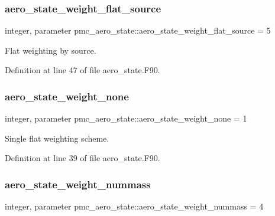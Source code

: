 \subsubsection{\texorpdfstring{aero\+\_\+state\+\_\+weight\+\_\+flat\+\_\+source}{aero\_state\_weight\_flat\_source}}
{\footnotesize\ttfamily integer, parameter pmc\+\_\+aero\+\_\+state\+::aero\+\_\+state\+\_\+weight\+\_\+flat\+\_\+source = 5}



Flat weighting by source. 



Definition at line 47 of file aero\+\_\+state.\+F90.

\mbox{\label{namespacepmc__aero__state_afae976ee50ab7c0415628dd99a6feded}} 
\subsubsection{\texorpdfstring{aero\+\_\+state\+\_\+weight\+\_\+none}{aero\_state\_weight\_none}}
{\footnotesize\ttfamily integer, parameter pmc\+\_\+aero\+\_\+state\+::aero\+\_\+state\+\_\+weight\+\_\+none = 1}



Single flat weighting scheme. 



Definition at line 39 of file aero\+\_\+state.\+F90.

\mbox{\label{namespacepmc__aero__state_aa014d0549b2455e245bef4959b781af3}} 
\subsubsection{\texorpdfstring{aero\+\_\+state\+\_\+weight\+\_\+nummass}{aero\_state\_weight\_nummass}}
{\footnotesize\ttfamily integer, parameter pmc\+\_\+aero\+\_\+state\+::aero\+\_\+state\+\_\+weight\+\_\+nummass = 4}




